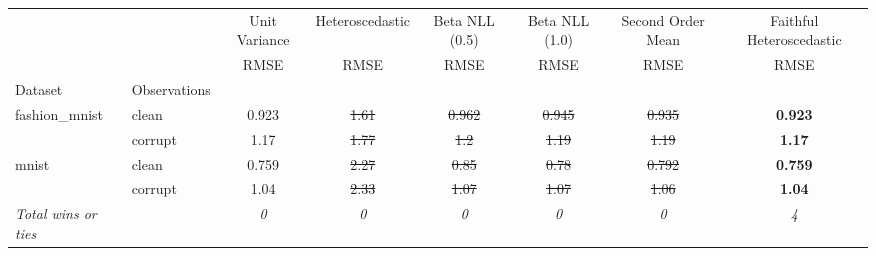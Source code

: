 \begin{tabular}{ll|c|c|c|c|c|c}
\toprule
{} & {} & {Unit Variance} & {Heteroscedastic} & {Beta NLL (0.5)} & {Beta NLL (1.0)} & {Second Order Mean} & {Faithful Heteroscedastic} \\
{} & {} & {RMSE} & {RMSE} & {RMSE} & {RMSE} & {RMSE} & {RMSE} \\
{Dataset} & {Observations} & {} & {} & {} & {} & {} & {} \\
\midrule
\multirow[t]{2}{*}{fashion_mnist} & clean & 0.923 & \sout{1.61} & \sout{0.962} & \sout{0.945} & \sout{0.935} & \textbf{0.923} \\
 & corrupt & 1.17 & \sout{1.77} & \sout{1.2} & \sout{1.19} & \sout{1.19} & \textbf{1.17} \\
\multirow[t]{2}{*}{mnist} & clean & 0.759 & \sout{2.27} & \sout{0.85} & \sout{0.78} & \sout{0.792} & \textbf{0.759} \\
 & corrupt & 1.04 & \sout{2.33} & \sout{1.07} & \sout{1.07} & \sout{1.06} & \textbf{1.04} \\
\textit{{Total wins or ties}} &  & \textit{0} & \textit{0} & \textit{0} & \textit{0} & \textit{0} & \textit{4} \\
\bottomrule
\end{tabular}
